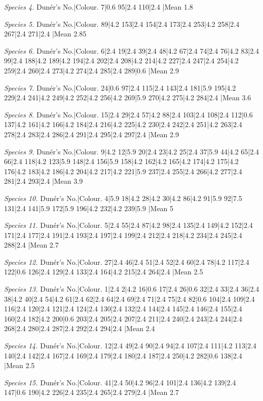 \documentclass[a4paper, 12pt, oneside, polutonikogreek, english]{article}
\begin{document}
\emph{Species 4.} 
Dunér's No.|Colour. 
7|0.6 
95|2.4 
110|2.4 
|Mean 1.8 

\emph{Species 5.} 
Dunér's No.|Colour. 
89|4.2 
153|2.4 
154|2.4 
173|2.4 
253|4.2 
258|2.4 
267|2.4 
271|2.4 
|Mean 2.85 

\emph{Species 6.} 
Dunér's No.|Colour. 
6|2.4 
19|2.4 
39|2.4 
48|4.2 
67|2.4 
74|2.4 
76|4.2 
83|2.4 
99|2.4 
188|4.2 
189|4.2 
194|2.4 
202|2.4 
208|4.2 
214|4.2 
227|2.4 
247|2.4 
254|4.2 
259|2.4 
260|2.4 
273|4.2 
274|2.4 
285|2.4 
289|0.6 
|Mean 2.9 

\emph{Species 7.} 
Dunér's No.|Colour. 
24|0.6 
97|2.4 
115|2.4 
143|2.4 
181|5.9 
195|4.2 
229|2.4 
241|4.2 
249|4.2 
252|4.2 
256|4.2 
269|5.9 
270|4.2 
275|4.2 
284|2.4 
|Mean 3.6 

\emph{Species 8.} 
Dunér's No.|Colour. 
15|2.4 
29|2.4 
57|4.2 
88|2.4 
103|2.4 
108|2.4 
112|0.6 
137|4.2 
161|4.2 
166|4.2 
184|2.4 
216|4.2 
225|4.2 
230|2.4 
242|2.4 
251|4.2 
263|2.4 
278|2.4 
283|2.4 
286|2.4 
291|2.4 
295|2.4 
297|2.4 
|Mean 2.9 

\emph{Species 9.} 
Dunér's No.|Colour. 
9|4.2 
12|5.9 
20|2.4 
23|4.2 
25|2.4 
37|5.9 
44|4.2 
65|2.4 
66|2.4 
118|4.2 
123|5.9 
148|2.4 
156|5.9 
158|4.2 
162|4.2 
165|4.2 
174|4.2 
175|4.2 
176|4.2 
183|4.2 
186|4.2 
204|4.2 
217|4.2 
221|5.9 
237|2.4 
255|2.4 
266|4.2 
277|2.4 
281|2.4 
293|2.4 
|Mean 3.9 

\emph{Species 10.} 
Dunér's No.|Colour. 
4|5.9 
18|4.2 
28|4.2 
30|4.2 
86|4.2 
91|5.9 
92|7.5 
131|2.4 
141|5.9 
172|5.9 
196|4.2 
232|4.2 
239|5.9 
|Mean 5 

\emph{Species 11.} 
Dunér's No.|Colour. 
5|2.4 
55|2.4 
87|4.2 
98|2.4 
135|2.4 
149|4.2 
152|2.4 
171|2.4 
177|2.4 
191|2.4 
193|2.4 
197|2.4 
199|2.4 
212|2.4 
218|4.2 
234|2.4 
245|2.4 
288|2.4 
|Mean 2.7 

\emph{Species 12.} 
Dunér's No.|Colour. 
27|2.4 
46|2.4 
51|2.4 
52|2.4 
60|2.4 
78|4.2 
117|2.4 
122|0.6 
126|2.4 
129|2.4 
133|2.4 
164|4.2 
215|2.4 
264|2.4 
|Mean 2.5

\emph{Species 13.} 
Dunér's No.|Colour. 
1|2.4 
2|4.2 
16|0.6 
17|2.4 
26|0.6 
32|2.4 
33|2.4 
36|2.4 
38|4.2 
40|2.4 
54|4.2 
61|2.4 
62|2.4 
64|2.4 
69|2.4 
71|2.4 
75|2.4 
82|0.6 
104|2.4 
109|2.4 
116|2.4 
120|2.4 
121|2.4 
124|2.4 
130|2.4 
132|2.4 
144|2.4 
145|2.4 
146|2.4 
155|2.4 
160|2.4 
182|4.2 
200|0.6 
203|2.4 
205|2.4 
207|2.4 
211|2.4 
240|2.4 
243|2.4 
244|2.4 
268|2.4 
280|2.4 
287|2.4 
292|2.4 
294|2.4 
|Mean 2.4

\emph{Species 14.} 
Dunér's No.|Colour. 
12|2.4 
49|2.4 
90|2.4 
94|2.4 
107|2.4 
111|4.2 
113|2.4 
140|2.4 
142|2.4 
167|2.4 
169|2.4 
179|2.4 
180|2.4 
187|2.4 
250|4.2 
282|0.6 
138|2.4 
|Mean 2.5

\emph{Species 15.} 
Dunér's No.|Colour. 
41|2.4 
50|4.2 
96|2.4 
101|2.4 
136|4.2 
139|2.4 
147|0.6 
190|4.2 
226|2.4 
235|2.4 
265|2.4 
279|2.4 
|Mean 2.7 
\end{document}
